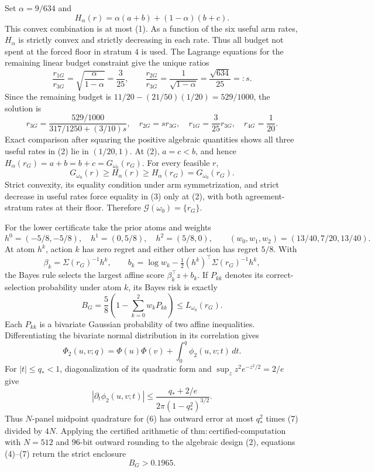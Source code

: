 Set \(\alpha=9/634\) and
\[
 H_\alpha(r)=\alpha(a+b)+(1-\alpha)(b+c).
\]
This convex combination is at most (1).  As a function of the six useful arm rates, \(H_\alpha\) is strictly convex and strictly decreasing in each rate.  Thus all budget not spent at the forced floor in stratum \(4\) is used.  The Lagrange equations for the remaining linear budget constraint give the unique ratios
\[
 \frac{r_{1G}}{r_{3G}}=\sqrt{\frac\alpha{1-\alpha}}=\frac3{25},\qquad
 \frac{r_{2G}}{r_{3G}}=\frac1{\sqrt{1-\alpha}}=\frac{\sqrt{634}}{25}=:s.
\]
Since the remaining budget is \(11/20-(21/50)(1/20)=529/1000\), the solution is
\[
 r_{3G}=\frac{529/1000}{317/1250+(3/10)s},\quad
 r_{2G}=sr_{3G},\quad r_{1G}=\frac3{25}r_{3G},\quad r_{4G}=\frac1{20}. \tag{2}
\]
Exact comparison after squaring the positive algebraic quantities shows all three useful rates in (2) lie in \((1/20,1)\).  At (2), \(a=c<b\), and hence \(H_\alpha(r_G)=a+b=b+c=G_{\omega_0}(r_G)\).  For every feasible \(r\),
\[
 G_{\omega_0}(r)\geq H_\alpha(r)\geq H_\alpha(r_G)=G_{\omega_0}(r_G). \tag{3}
\]
Strict convexity, its equality condition under arm symmetrization, and strict decrease in useful rates force equality in (3) only at (2), with both agreement-stratum rates at their floor.  Therefore \(\mathcal G(\omega_0)=\{r_G\}\).

For the lower certificate take the prior atoms and weights
\[
 h^0=(-5/8,-5/8),\quad h^1=(0,5/8),\quad h^2=(5/8,0),\qquad
 (w_0,w_1,w_2)=(13/40,7/20,13/40).                                  \tag{4}
\]
At atom \(h^k\), action \(k\) has zero regret and either other action has regret \(5/8\).  With
\[
 \beta_k=\Sigma(r_G)^{-1}h^k,\qquad
 b_k=\log w_k-\tfrac12(h^k)^\top\Sigma(r_G)^{-1}h^k,
\]
the Bayes rule selects the largest affine score \(\beta_k^\top z+b_k\).  If \(P_{kk}\) denotes its correct-selection probability under atom \(k\), its Bayes risk is exactly
\[
 B_G=\frac58\left(1-\sum_{k=0}^2w_kP_{kk}\right)\leq L_{\omega_0}(r_G). \tag{5}
\]
Each \(P_{kk}\) is a bivariate Gaussian probability of two affine inequalities.  Differentiating the bivariate normal distribution in its correlation gives
\[
 \Phi_2(u,v;q)=\Phi(u)\Phi(v)+\int_0^q\phi_2(u,v;t)\,dt.              \tag{6}
\]
For \(|t|\leq q_*<1\), diagonalization of its quadratic form and \(\sup_z z^2e^{-z^2/2}=2/e\) give
\[
 |\partial_t\phi_2(u,v;t)|\leq
 \frac{q_*+2/e}{2\pi(1-q_*^2)^{3/2}}.                               \tag{7}
\]
Thus \(N\)-panel midpoint quadrature for (6) has outward error at most \(q_*^2\) times (7) divided by \(4N\).  Applying the certified arithmetic of \(\mathrm{thm:certified\text{-}computation}\) with \(N=512\) and \(96\)-bit outward rounding to the algebraic design (2), equations (4)--(7) return the strict enclosure
\[
 B_G>0.1965.                                                         \tag{8}
\]

